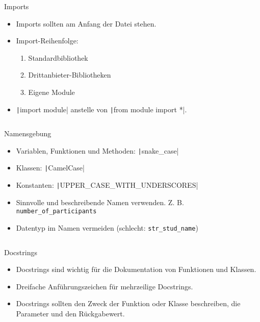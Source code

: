 \documentclass[xelatex,aspectratio=169]{beamer}
\begin{document}
\begin{frame}{Imports}
    \begin{itemize}
        \item Imports sollten am Anfang der Datei stehen.
        \item Import-Reihenfolge:
              \begin{enumerate}
                  \item Standardbibliothek
                  \item Drittanbieter-Bibliotheken
                  \item Eigene Module
              \end{enumerate}
        \item \texttt|import module| anstelle von \texttt|from module import *|.
    \end{itemize}
    \inputminted{python}{src/style_imports.py}
\end{frame}

\begin{frame}{Namensgebung}
    \begin{itemize}
        \item Variablen, Funktionen und Methoden: \texttt|snake_case|
        \item Klassen: \texttt|CamelCase|
        \item Konstanten: \texttt|UPPER_CASE_WITH_UNDERSCORES|
        \item Sinnvolle und beschreibende Namen verwenden. Z. B. \texttt{number\_of\_participants}
        \item Datentyp im Namen vermeiden (schlecht: \texttt{str\_stud\_name})
    \end{itemize}
    \inputminted{python}{src/style_naming_variables.py}

\end{frame}

\begin{frame}{Docstrings}
    \begin{itemize}
        \item Docstrings sind wichtig für die Dokumentation von Funktionen und Klassen.
        \item Dreifache Anführungszeichen für mehrzeilige Docstrings.
        \item Docstrings sollten den Zweck der Funktion oder Klasse beschreiben, die Parameter und den Rückgabewert.
    \end{itemize}
    \inputminted[firstline=4]{python}{src/style_docstrings.py}

\end{frame}
\end{document}
